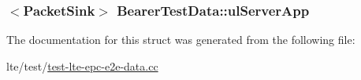 \subsubsection[{\texorpdfstring{ul\+Server\+App}{ulServerApp}}]{$<${\bf Packet\+Sink}$>$ Bearer\+Test\+Data\+::ul\+Server\+App}\hypertarget{structBearerTestData_a8fce1512a7cf16729114a69bab92d99e}{}\label{structBearerTestData_a8fce1512a7cf16729114a69bab92d99e}


The documentation for this struct was generated from the following file\+:\begin{DoxyCompactItemize}
\item 
lte/test/\hyperlink{test-lte-epc-e2e-data_8cc}{test-\/lte-\/epc-\/e2e-\/data.\+cc}\end{DoxyCompactItemize}
